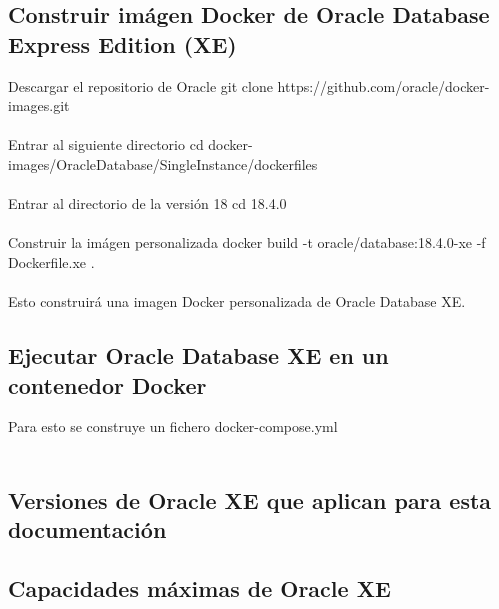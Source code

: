\documentclass{article}
\begin{document}
\subsection{Construir imágen Docker de Oracle Database Express Edition (XE)}
Descargar el repositorio de Oracle \newline
git clone https://github.com/oracle/docker-images.git \newline
\\ \\
Entrar al siguiente directorio \newline
cd docker-images/OracleDatabase/SingleInstance/dockerfiles \newline
\\ \\
Entrar al directorio de la versión 18 \newline
cd 18.4.0 \newline
\\ \\
Construir la imágen personalizada \newline
docker build -t oracle/database:18.4.0-xe -f Dockerfile.xe . \newline
\\ \\
Esto construirá una imagen Docker personalizada de Oracle Database XE.
\subsection{Ejecutar Oracle Database XE en un contenedor Docker}
Para esto se construye un fichero docker-compose.yml \newline
\\ \\
\subsection{Versiones de Oracle XE que aplican para esta documentación}
\subsection{Capacidades máximas de Oracle XE}

%
%
%
%
%
\end{document}
